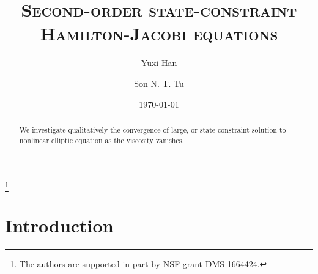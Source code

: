 \documentclass[11pt,reqno]{amsart}
\numberwithin{figure}{section}
\theoremstyle{plain}
\theoremstyle{remark}
\numberwithin{equation}{section}
\begin{document}
\title[Rate of convergence]
{\textsc{Second-order state-constraint Hamilton-Jacobi equations}}
\thanks{The authors are supported in part by NSF grant DMS-1664424.}
\begin{abstract}
We investigate qualitatively the convergence of large, or state-constraint solution to nonlinear elliptic equation as the viscosity vanishes.
\end{abstract}
\author{Yuxi Han}
\address[Y. Han]
{
Department of Mathematics, 
University of Wisconsin Madison, 480 Lincoln  Drive, Madison, WI 53706, USA}
\author{Son N. T. Tu}
\address[S. N.T. Tu]
{
Department of Mathematics, 
University of Wisconsin Madison, 480 Lincoln  Drive, Madison, WI 53706, USA}
\date{\today}
\maketitle
\setcounter{tocdepth}{1}
\tableofcontents

\section{Introduction}\label{sec:intro}
\end{document}
